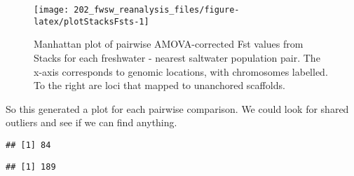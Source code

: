 \documentclass[11pt,]{article}
\newenvironment{Shaded}{\begin{snugshade}}{\end{snugshade}}
\newcommand{\KeywordTok}[1]{\textcolor[rgb]{0.13,0.29,0.53}{\textbf{#1}}}
\newcommand{\FloatTok}[1]{\textcolor[rgb]{0.00,0.00,0.81}{#1}}
\newcommand{\StringTok}[1]{\textcolor[rgb]{0.31,0.60,0.02}{#1}}
\newcommand{\OperatorTok}[1]{\textcolor[rgb]{0.81,0.36,0.00}{\textbf{#1}}}
\newcommand{\NormalTok}[1]{#1}
\begin{document}
\begin{figure}[H]
\texttt{[image: 202\_fwsw\_reanalysis\_files/figure-latex/plotStacksFsts-1]} \caption{Manhattan plot of pairwise AMOVA-corrected Fst values from Stacks for each freshwater - nearest saltwater population pair. The x-axis corresponds to genomic locations, with chromosomes labelled. To the right are loci that mapped to unanchored scaffolds.}\label{fig:plotStacksFsts}
\end{figure}

So this generated a plot for each pairwise comparison. We could look for
shared outliers and see if we can find anything.

\begin{Shaded}
\end{Shaded}

\begin{verbatim}
## [1] 84
\end{verbatim}

\begin{Shaded}
\end{Shaded}

\begin{verbatim}
## [1] 189
\end{verbatim}

\begin{Shaded}
\end{Shaded}
\end{document}
